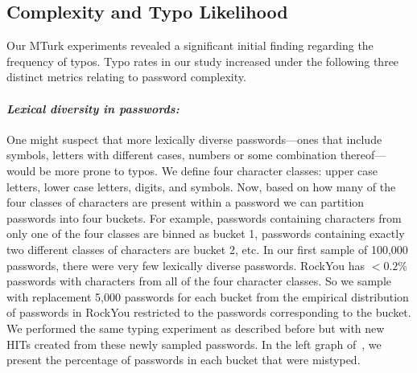\subsection{Complexity and Typo Likelihood} 
\label{app:complexity}

Our MTurk experiments revealed a significant initial finding regarding the frequency
of typos. Typo rates in our study increased under the following three distinct
metrics relating to password complexity.

\paragraph{\em Lexical diversity in passwords:}
One might suspect that more lexically diverse passwords---ones that
include symbols, letters with different cases, numbers or some
combination thereof---would be more prone to typos.  We define four character classes: upper case letters,
lower case letters, digits, and symbols.  Now, based on how many of
the four classes of characters are present within a password we can
partition passwords into four buckets. For example, passwords
containing characters from only one of the four classes are binned as
bucket 1, passwords containing exactly two different classes of
characters are bucket 2, etc.  In our first sample of 100,000
passwords, there were very few lexically diverse passwords. RockYou has $<0.2\%$
passwords with characters from all of the four character classes.
So we sample with replacement 5,000 passwords for each bucket from
the empirical distribution of passwords in RockYou restricted to the
passwords corresponding to the bucket. We performed the same
typing experiment as described before but with new HITs created from these
newly sampled passwords. In the left graph of~, we present the percentage of passwords in each bucket that were mistyped.





